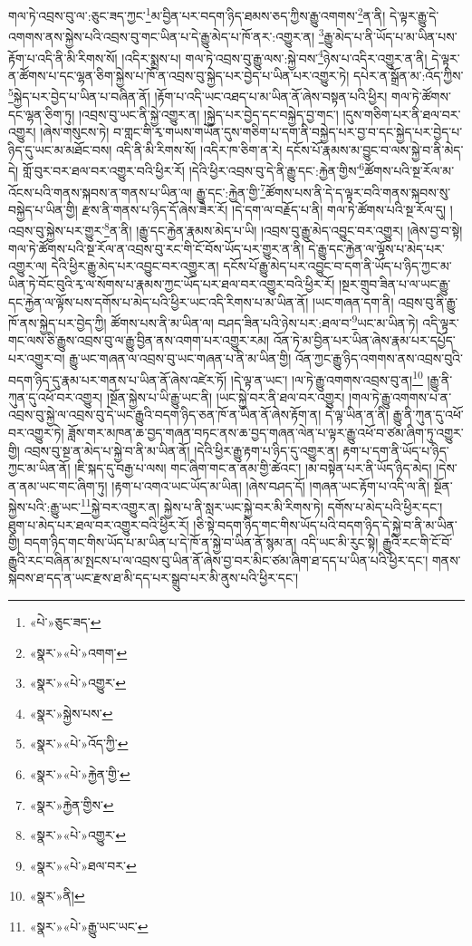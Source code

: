 གལ་ཏེ་འབྲས་བུ་ལ་:ཅུང་ཟད་ཀྱང་\footnote{«པེ་»ཅུང་ཟད་}མ་བྱིན་པར་བདག་ཉིད་ཐམས་ཅད་ཀྱིས་རྒྱུ་འགགས་\footnote{«སྣར་»«པེ་»འགག་}ན་ནི། དེ་ལྟར་རྒྱུ་དེ་འགགས་ནས་སྐྱེས་པའི་འབྲས་བུ་གང་ཡིན་པ་དེ་རྒྱུ་མེད་པ་ཁོ་ནར་:འགྱུར་ན། \footnote{«སྣར་»«པེ་»འགྱུར་}རྒྱུ་མེད་པ་ནི་ཡོད་པ་མ་ཡིན་པས་རྟོག་པ་འདི་ནི་མི་རིགས་སོ། །འདིར་སྨྲས་པ། གལ་ཏེ་འབྲས་བུ་རྒྱུ་ལས་:སྐྱེ་བས་\footnote{«སྣར་»སྐྱེས་པས་}ཉེས་པ་འདིར་འགྱུར་ན་ནི། དེ་ལྟར་ན་ཚོགས་པ་དང་ལྷན་ཅིག་སྐྱེས་པ་ཁོ་ན་འབྲས་བུ་སྐྱེད་པར་བྱེད་པ་ཡིན་པར་འགྱུར་ཏེ། དཔེར་ན་སྒྲོན་མ་:འོད་ཀྱིས་\footnote{«སྣར་»«པེ་»འོད་ཀྱི་}སྐྱེད་པར་བྱེད་པ་ཡིན་པ་བཞིན་ནོ། །རྟོག་པ་འདི་ཡང་འཐད་པ་མ་ཡིན་ནོ་ཞེས་བསྟན་པའི་ཕྱིར། གལ་ཏེ་ཚོགས་དང་ལྷན་ཅིག་ཏུ། །འབྲས་བུ་ཡང་ནི་སྐྱེ་འགྱུར་ན། །སྐྱེད་པར་བྱེད་དང་བསྐྱེད་བྱ་གང་། །དུས་གཅིག་པར་ནི་ཐལ་བར་འགྱུར། །ཞེས་གསུངས་ཏེ། བ་གླང་གི་རྭ་གཡས་གཡོན་དུས་གཅིག་པ་དག་ནི་བསྐྱེད་པར་བྱ་བ་དང་སྐྱེད་པར་བྱེད་པ་ཉིད་དུ་ཡང་མ་མཐོང་བས། འདི་ནི་མི་རིགས་སོ། །འདིར་ཁ་ཅིག་ན་རེ། དངོས་པོ་རྣམས་མ་བྱུང་བ་ལས་སྐྱེ་བ་ནི་མེད་དེ། གློ་བུར་བར་ཐལ་བར་འགྱུར་བའི་ཕྱིར་རོ། །དེའི་ཕྱིར་འབྲས་བུ་དེ་ནི་རྒྱུ་དང་:རྐྱེན་གྱིས་\footnote{«སྣར་»«པེ་»རྐྱེན་གྱི་}ཚོགས་པའི་སྔ་རོལ་མ་འོངས་པའི་གནས་སྐབས་ན་གནས་པ་ཡིན་ལ། རྒྱུ་དང་:རྐྱེན་གྱི་\footnote{«སྣར་»རྐྱེན་གྱིས་}ཚོགས་པས་ནི་དེ་ད་ལྟར་བའི་གནས་སྐབས་སུ་བསྐྱེད་པ་ཡིན་གྱི། རྫས་ནི་གནས་པ་ཉིད་དོ་ཞེས་ཟེར་རོ། །དེ་དག་ལ་བརྗོད་པ་ནི། གལ་ཏེ་ཚོགས་པའི་སྔ་རོལ་དུ། །འབྲས་བུ་སྐྱེས་པར་གྱུར་\footnote{«སྣར་»«པེ་»འགྱུར་}ན་ནི། །རྒྱུ་དང་རྐྱེན་རྣམས་མེད་པ་ཡི། །འབྲས་བུ་རྒྱུ་མེད་འབྱུང་བར་འགྱུར། །ཞེས་བྱ་བ་སྟེ། གལ་ཏེ་ཚོགས་པའི་སྔ་རོལ་ན་འབྲས་བུ་རང་གི་ངོ་བོས་ཡོད་པར་གྱུར་ན་ནི། དེ་རྒྱུ་དང་རྐྱེན་ལ་ལྟོས་པ་མེད་པར་འགྱུར་ལ། དེའི་ཕྱིར་རྒྱུ་མེད་པར་འབྱུང་བར་འགྱུར་ན། དངོས་པོ་རྒྱུ་མེད་པར་འབྱུང་བ་དག་ནི་ཡོད་པ་ཉིད་ཀྱང་མ་ཡིན་ཏེ་བོང་བུའི་རྭ་ལ་སོགས་པ་རྣམས་ཀྱང་ཡོད་པར་ཐལ་བར་འགྱུར་བའི་ཕྱིར་རོ། །སྔར་གྲུབ་ཟིན་པ་ལ་ཡང་རྒྱུ་དང་རྐྱེན་ལ་ལྟོས་པས་དགོས་པ་མེད་པའི་ཕྱིར་ཡང་འདི་རིགས་པ་མ་ཡིན་ནོ། །ཡང་གཞན་དག་ནི། འབྲས་བུ་ནི་རྒྱུ་ཁོ་ནས་སྐྱེད་པར་བྱེད་ཀྱི། ཚོགས་པས་ནི་མ་ཡིན་ལ། བཤད་ཟིན་པའི་ཉེས་པར་:ཐལ་བ་\footnote{«སྣར་»«པེ་»ཐལ་བར་}ཡང་མ་ཡིན་ཏེ། འདི་ལྟར་གང་ལས་ཅི་རྒྱུས་འབྲས་བུ་ལ་རྒྱུ་བྱིན་ནས་འགག་པར་འགྱུར་རམ། འོན་ཏེ་མ་བྱིན་པར་ཡིན་ཞེས་རྣམ་པར་དཔྱོད་པར་འགྱུར་བ། རྒྱུ་ཡང་གཞན་ལ་འབྲས་བུ་ཡང་གཞན་པ་ནི་མ་ཡིན་གྱི། འོན་ཀྱང་རྒྱུ་ཉིད་འགགས་ནས་འབྲས་བུའི་བདག་ཉིད་དུ་རྣམ་པར་གནས་པ་ཡིན་ནོ་ཞེས་འཛེར་ཏོ། །དེ་ལྟ་ན་ཡང་། །ལ་ཏེ་རྒྱུ་འགགས་འབྲས་བུ་ན།\footnote{«སྣར་»ནི།} །རྒྱུ་ནི་ཀུན་དུ་འཕོ་བར་འགྱུར། །སྔོན་སྐྱེས་པ་ཡི་རྒྱུ་ཡང་ནི། །ཡང་སྐྱེ་བར་ནི་ཐལ་བར་འགྱུར། །གལ་ཏེ་རྒྱུ་འགགས་པ་ན་འབྲས་བུ་སྐྱེ་ལ་འབྲས་བུ་དེ་ཡང་རྒྱུའི་བདག་ཉིད་ཅན་ཁོ་ན་ཡིན་ནོ་ཞེས་རྟོག་ན། དེ་ལྟ་ཡིན་ན་ནི། རྒྱུ་ནི་ཀུན་དུ་འཕོ་བར་འགྱུར་ཏེ། ཟློས་གར་མཁན་ཆ་བྱད་གཞན་བཏང་ནས་ཆ་བྱད་གཞན་ལེན་པ་ལྟར་རྒྱུ་འཕོ་བ་ཙམ་ཞིག་ཏུ་འགྱུར་གྱི། འབྲས་བུ་སྔ་ན་མེད་པ་སྐྱེ་བ་ནི་མ་ཡིན་ནོ། །དེའི་ཕྱིར་རྒྱུ་རྟག་པ་ཉིད་དུ་འགྱུར་ན། རྟག་པ་དག་ནི་ཡོད་པ་ཉིད་ཀྱང་མ་ཡིན་ནོ། །ཇི་སྐད་དུ་བརྒྱ་པ་ལས། གང་ཞིག་གང་ན་ནམ་གྱི་ཚེའང་། །མ་བསྟེན་པར་ནི་ཡོད་ཉིད་མེད། །དེས་ན་ནམ་ཡང་གང་ཞིག་ཏུ། །རྟག་པ་འགའ་ཡང་ཡོད་མ་ཡིན། །ཞེས་བཤད་དོ། །གཞན་ཡང་རྟོག་པ་འདི་ལ་ནི། སྔོན་སྐྱེས་པའི་:རྒྱུ་ཡང་\footnote{«སྣར་»«པེ་»རྒྱུ་ཡང་ཡང་}སྐྱེ་བར་འགྱུར་ན། སྐྱེས་པ་ནི་སླར་ཡང་སྐྱེ་བར་མི་རིགས་ཏེ། དགོས་པ་མེད་པའི་ཕྱིར་དང་། ཐུག་པ་མེད་པར་ཐལ་བར་འགྱུར་བའི་ཕྱིར་རོ། །ཅི་སྟེ་བདག་ཉིད་གང་གིས་ཡོད་པའི་བདག་ཉིད་དེ་སྐྱེ་བ་ནི་མ་ཡིན་གྱི། བདག་ཉིད་གང་གིས་ཡོད་པ་མ་ཡིན་པ་དེ་ཁོ་ན་སྐྱེ་བ་ཡིན་ནོ་སྙམ་ན། འདི་ཡང་མི་རུང་སྟེ། རྒྱུའི་རང་གི་ངོ་བོ་རྒྱུའི་རང་བཞིན་མ་སྤངས་པ་ལ་འབྲས་བུ་ཡིན་ནོ་ཞེས་བྱ་བར་མིང་ཙམ་ཞིག་ཐ་དད་པ་ཡིན་པའི་ཕྱིར་དང་། གནས་སྐབས་ཐ་དད་ན་ཡང་རྫས་ཐ་མི་དད་པར་སྒྲུབ་པར་མི་ནུས་པའི་ཕྱིར་དང་། 
